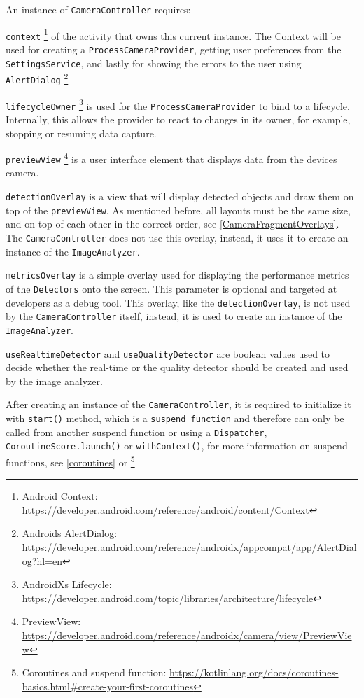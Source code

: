 An instance of \texttt{CameraController} requires:

\texttt{context} \footnote{Android Context: \url{https://developer.android.com/reference/android/content/Context}} of the activity that owns this current instance. The Context will be used for creating a \texttt{ProcessCameraProvider}, getting user preferences from the \texttt{SettingsService}, and lastly for showing the errors to the user using \texttt{AlertDialog} \footnote{Androids AlertDialog: \url{https://developer.android.com/reference/androidx/appcompat/app/AlertDialog?hl=en}}

\texttt{lifecycleOwner} \footnote{AndroidXs Lifecycle: \url{https://developer.android.com/topic/libraries/architecture/lifecycle}} is used for the \texttt{ProcessCameraProvider} to bind to a lifecycle. Internally, this allows the provider to react to changes in its owner, for example, stopping or resuming data capture.

\texttt{previewView} \footnote{PreviewView: \url{https://developer.android.com/reference/androidx/camera/view/PreviewView}} is a user interface element that displays data from the devices camera.

\texttt{detectionOverlay} is a view that will display detected objects and draw them on top of the \texttt{previewView}. As mentioned before, all layouts must be the same size, and on top of each other in the correct order, see \ref{CameraFragmentOverlays}. The \texttt{CameraController} does not use this overlay, instead, it uses it to create an instance of the \texttt{ImageAnalyzer}.

\texttt{metricsOverlay} is a simple overlay used for displaying the performance metrics of the \texttt{Detectors} onto the screen. This parameter is optional and targeted at developers as a debug tool. This overlay, like the \texttt{detectionOverlay}, is not used by the \texttt{CameraController} itself, instead, it is used to create an instance of the \texttt{ImageAnalyzer}.

\texttt{useRealtimeDetector} and \texttt{useQualityDetector} are boolean values used to decide whether the real-time or the quality detector should be created and used by the image analyzer. 

After creating an instance of the \texttt{CameraController}, it is required to initialize it with \texttt{start()} method, which is a \texttt{suspend function} and therefore can only be called from another suspend function or using a \texttt{Dispatcher}, \texttt{CoroutineScore.launch()} or \texttt{withContext()}, for more information on suspend functions, see \ref{coroutines} or \footnote{Coroutines and suspend function: \url{https://kotlinlang.org/docs/coroutines-basics.html\#create-your-first-coroutines}}



